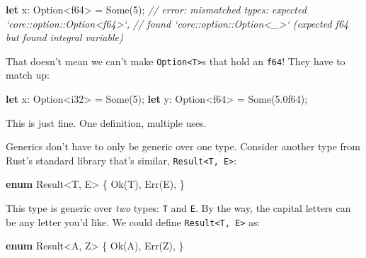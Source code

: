\documentclass[a4paper,]{book}
\newenvironment{Shaded}{\begin{snugshade}}{\end{snugshade}}
\newcommand{\KeywordTok}[1]{\textcolor[rgb]{0.13,0.29,0.53}{\textbf{{#1}}}}
\newcommand{\DataTypeTok}[1]{\textcolor[rgb]{0.13,0.29,0.53}{{#1}}}
\newcommand{\DecValTok}[1]{\textcolor[rgb]{0.00,0.00,0.81}{{#1}}}
\newcommand{\ConstantTok}[1]{\textcolor[rgb]{0.00,0.00,0.00}{{#1}}}
\newcommand{\CommentTok}[1]{\textcolor[rgb]{0.56,0.35,0.01}{\textit{{#1}}}}
\newcommand{\NormalTok}[1]{{#1}}
\begin{document}
\begin{Shaded}
\begin{Highlighting}[]
\KeywordTok{let} \NormalTok{x: }\DataTypeTok{Option}\NormalTok{<}\DataTypeTok{f64}\NormalTok{> = }\ConstantTok{Some}\NormalTok{(}\DecValTok{5}\NormalTok{);}
\CommentTok{// error: mismatched types: expected `core::option::Option<f64>`,}
\CommentTok{// found `core::option::Option<_>` (expected f64 but found integral variable)}
\end{Highlighting}
\end{Shaded}

That doesn't mean we can't make
\texttt{Option\textless{}T\textgreater{}}s that hold an \texttt{f64}!
They have to match up:

\begin{Shaded}
\begin{Highlighting}[]
\KeywordTok{let} \NormalTok{x: }\DataTypeTok{Option}\NormalTok{<}\DataTypeTok{i32}\NormalTok{> = }\ConstantTok{Some}\NormalTok{(}\DecValTok{5}\NormalTok{);}
\KeywordTok{let} \NormalTok{y: }\DataTypeTok{Option}\NormalTok{<}\DataTypeTok{f64}\NormalTok{> = }\ConstantTok{Some}\NormalTok{(}\DecValTok{5.0f64}\NormalTok{);}
\end{Highlighting}
\end{Shaded}

This is just fine. One definition, multiple uses.

Generics don't have to only be generic over one type. Consider another
type from Rust's standard library that's similar,
\texttt{Result\textless{}T,\ E\textgreater{}}:

\begin{Shaded}
\begin{Highlighting}[]
\KeywordTok{enum} \DataTypeTok{Result}\NormalTok{<T, E> \{}
    \ConstantTok{Ok}\NormalTok{(T),}
    \ConstantTok{Err}\NormalTok{(E),}
\NormalTok{\}}
\end{Highlighting}
\end{Shaded}

This type is generic over \emph{two} types: \texttt{T} and \texttt{E}.
By the way, the capital letters can be any letter you'd like. We could
define \texttt{Result\textless{}T,\ E\textgreater{}} as:

\begin{Shaded}
\begin{Highlighting}[]
\KeywordTok{enum} \DataTypeTok{Result}\NormalTok{<A, Z> \{}
    \ConstantTok{Ok}\NormalTok{(A),}
    \ConstantTok{Err}\NormalTok{(Z),}
\NormalTok{\}}
\end{Highlighting}
\end{Shaded}
\end{document}

